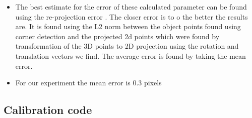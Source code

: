 \begin{itemize}
    
        \item The best estimate for the error of these calculated parameter can be found using the re-projection error . The closer error is to o the better the results are. It is found using the L2 norm between the object points found using corner detection and the projected 2d points which were found by transformation of the 3D points to 2D projection using the rotation and translation vectors we find. The average error is found by taking the mean error.
        
        \item For our experiment the mean error is $0.3$ pixels
                            
                            
   \end{itemize}
   
       \subsection{Calibration code}\label{CodeCalibration}
   
